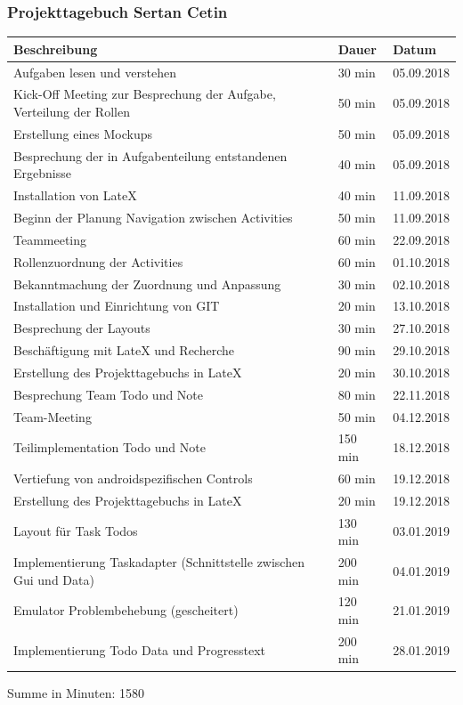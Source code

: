 \subsubsection{Projekttagebuch Sertan Cetin}
\begin{longtable}{|p{10cm}|p{2cm}|p{2cm}|}
\hline
{\textbf{Beschreibung}} & {\textbf{Dauer}} & {\textbf{Datum}} \\ \hline
Aufgaben lesen und verstehen & 30 min & 05.09.2018\\ \hline 
Kick-Off Meeting zur Besprechung der Aufgabe, Verteilung der Rollen & 50 min & 05.09.2018\\ \hline 
Erstellung eines Mockups & 50 min & 05.09.2018\\ \hline 
Besprechung der in Aufgabenteilung entstandenen Ergebnisse & 40 min & 05.09.2018\\ \hline 
Installation von LateX & 40 min & 11.09.2018\\ \hline 
Beginn der Planung Navigation zwischen Activities & 50 min & 11.09.2018\\ \hline 
Teammeeting & 60 min & 22.09.2018\\ \hline 
Rollenzuordnung der Activities & 60 min & 01.10.2018\\ \hline 
Bekanntmachung der Zuordnung und Anpassung & 30 min & 02.10.2018\\ \hline 
Installation und Einrichtung von GIT & 20 min & 13.10.2018\\ \hline 
Besprechung der Layouts & 30 min & 27.10.2018\\ \hline 
Beschäftigung mit LateX und Recherche & 90 min & 29.10.2018\\ \hline 
Erstellung des Projekttagebuchs in LateX & 20 min & 30.10.2018\\ \hline 
Besprechung Team Todo und Note & 80 min & 22.11.2018\\ \hline 
Team-Meeting & 50 min & 04.12.2018\\ \hline 
Teilimplementation Todo und Note & 150 min & 18.12.2018\\ \hline 
Vertiefung von androidspezifischen Controls & 60 min & 19.12.2018\\ \hline 
Erstellung des Projekttagebuchs in LateX & 20 min & 19.12.2018\\ \hline 
Layout für Task Todos & 130 min & 03.01.2019\\ \hline 
Implementierung Taskadapter (Schnittstelle zwischen Gui und Data) & 200 min & 04.01.2019\\ \hline 
Emulator Problembehebung (gescheitert) & 120 min & 21.01.2019\\ \hline 
Implementierung Todo Data und Progresstext & 200 min & 28.01.2019\\ \hline
\end{longtable}
Summe in Minuten: 1580

